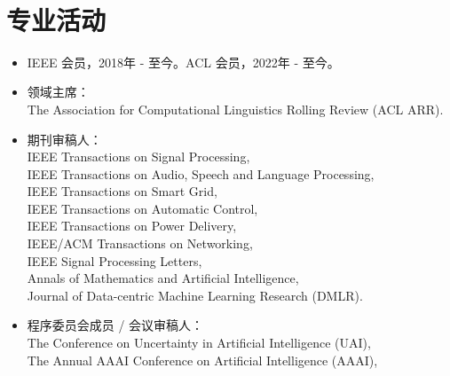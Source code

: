 \documentclass{resume}
\begin{document}

\

\section{专业活动}
\begin{itemize}
\item IEEE 会员，2018年 - 至今。ACL 会员，2022年 - 至今。
\item 领域主席： \\
The Association for Computational Linguistics Rolling Review (ACL ARR).
\item 期刊审稿人： \\
IEEE Transactions on Signal Processing, \\
IEEE Transactions on Audio, Speech and Language Processing, \\
IEEE Transactions on Smart Grid, \\
IEEE Transactions on Automatic Control, \\
IEEE Transactions on Power Delivery, \\
IEEE/ACM Transactions on Networking, \\
IEEE Signal Processing Letters, \\
Annals of Mathematics and Artificial Intelligence, \\
Journal of Data-centric Machine Learning Research (DMLR).
\item 程序委员会成员 / 会议审稿人： \\
The Conference on Uncertainty in Artificial Intelligence (UAI), \\
The Annual AAAI Conference on Artificial Intelligence (AAAI), \\

\end{itemize}
\end{document}
